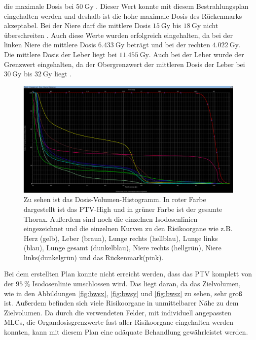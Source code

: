 die maximale Dosis bei $\SI{50}{\gray}$ \cite{QUANTEC}. Dieser Wert konnte mit diesem Bestrahlungsplan eingehalten werden und deshalb
ist die hohe maximale Dosis des Rückenmarks akzeptabel.
Bei der Niere darf die mittlere Dosis $\SI{15}{\gray}$ bis $\SI{18}{\gray}$ nicht überschreiten \cite{grenz}.
Auch diese Werte wurden erfolgreich eingehalten, da
bei der linken Niere die mittlere Dosis $\SI{6,433}{\gray}$ beträgt und bei der rechten $\SI{4,022}{\gray}$.
Die mittlere Dosis der Leber liegt bei $\SI{11,455}{\gray}$. Auch bei der Leber wurde der Grenzwert eingehalten,
da der Obergrenzwert der mittleren Dosis der Leber bei $\SI{30}{\gray}$ bis $\SI{32}{\gray}$ liegt \cite{QUANTEC}.

\begin{figure}[H]
	\centering
	\includegraphics[width=\linewidth]{Bilder/BWS_DVH}
	\caption{Zu sehen ist das Dosis-Volumen-Histogramm. In roter Farbe dargestellt ist das PTV-High und in grüner Farbe ist der gesamte Thorax. Außerdem sind noch die einzelnen Isodosenlinien eingezeichnet und die einzelnen Kurven zu den Risikoorgane wie z.B. Herz (gelb), Leber (braun), Lunge rechts (hellblau), Lunge links (blau), Lunge gesamt (dunkelblau), Niere rechts (hellgrün), Niere links(dunkelgrün) und das Rückenmark(pink).}
	\label{fig:bwsdvh}
\end{figure}

Bei dem erstellten Plan konnte nicht erreicht werden, dass das PTV komplett von der $\SI{95}{\percent}$
Isodosenlinie umschlossen wird. Das liegt daran, da das Zielvolumen, wie in den Abbildungen \ref{fig:bwsx}, \ref{fig:bwsy} und \ref{fig:bwsz}
zu sehen, sehr groß ist. Außerdem befinden sich viele Risikoorgane in unmittelbarer Nähe zu dem Zielvolumen.
Da durch die verwendeten Felder, mit individuell angepassten MLCs, die Organdosisgrenzwerte fast aller Risikoorgane eingehalten werden konnten,
kann mit diesem Plan eine adäquate Behandlung gewährleistet werden.
